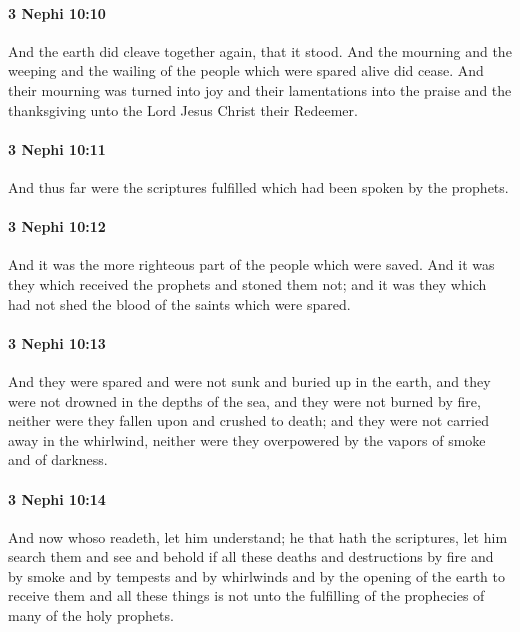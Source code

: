 		\paragraph{3 Nephi 10:10} %
			\label{3NEPHI-10-10}

			And the earth did cleave together again, that it stood.
			And the mourning and the weeping and the wailing
			of the people which were spared alive did cease.
			And their mourning was turned into joy
			and their lamentations into the praise and the thanksgiving
			unto the Lord Jesus Christ their Redeemer.

		\paragraph{3 Nephi 10:11} %
			\label{3NEPHI-10-11}

			And thus far were the scriptures fulfilled
			which had been spoken by the prophets.

		\paragraph{3 Nephi 10:12} %
			\label{3NEPHI-10-12}

			And it was the more righteous part of the people which were saved.
			And it was they which received the prophets and stoned them not;
			and it was they which had not shed the blood of the saints which were spared.

		\paragraph{3 Nephi 10:13} %
			\label{3NEPHI-10-13}

			And they were spared and were not sunk and buried up in the earth,
			and they were not drowned in the depths of the sea,
			and they were not burned by fire,
			neither were they fallen upon and crushed to death;
			and they were not carried away in the whirlwind,
			neither were they overpowered by the vapors of smoke and of darkness.

		\paragraph{3 Nephi 10:14} %
			\label{3NEPHI-10-14}

			And now whoso readeth, let him understand;
			he that hath the scriptures, let him search them
			and see and behold if all these deaths and destructions
			by fire and by smoke and by tempests and by whirlwinds
			and by the opening of the earth to receive them
			and all these things is not unto the fulfilling
			of the prophecies of many of the holy prophets.


